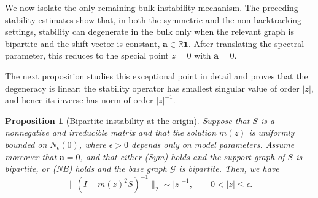 \documentclass[11pt,twoside, a4paper]{article}
\numberwithin{equation}{section}
\numberwithin{figure}{section}
\theoremstyle{plain} %
\newtheorem{proposition}[theorem]{Proposition}
\theoremstyle{definition}
\theoremstyle{remark}
\newcommand{\1} {\mspace{1 mu}}
\newcommand{\2} {\mspace{2 mu}}
\begin{document}
We now isolate the only remaining bulk instability mechanism. 
The preceding stability estimates show that, in both the symmetric and the non-backtracking settings, stability can degenerate in the bulk only when the relevant graph is bipartite and the shift vector is constant, \(\mathbf a\in\mathbb R\mathbf 1\). After translating the spectral parameter, this reduces to the special point \(z=0\) with \(\mathbf a=0\). 

The next proposition studies this exceptional point in detail and proves that the degeneracy is linear: the stability operator has smallest singular value of order \(|z|\), and hence its inverse has norm of order \(|z|^{-1}\).

\begin{proposition}[Bipartite instability at the origin]\label{prop.bipartite-origin-instability}
    Suppose that $S$ is a nonnegative and irreducible matrix and that the solution $m(z)$ is uniformly bounded on $N_\epsilon(0)$, where $\epsilon>0$ depends only on model parameters. Assume moreover that $\mathbf{a}=0$, and that either \textup{(Sym)} holds and the support graph of $S$ is bipartite, or \textup{(NB)} holds and the base graph $\mathcal G$ is bipartite.
    Then, we have
    \[
        \big\|(I-m(z)^2S)^{-1}\big\|_2\sim |z|^{-1},\qquad 0<|z|\le\epsilon.
    \]
\end{proposition}
\end{document}
